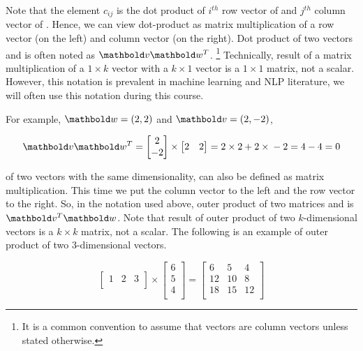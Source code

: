 Note that the element $c_{ij}$ is the dot product of
$i^{th}$ row vector of  and $j^{th}$ column vector of .
Hence, we can view dot-product as matrix multiplication
of a row vector (on the left) and column vector (on the right).
Dot product of two vectors  and  is often noted as
$\vect{v}\vect{w}^{T}$.%
\footnote{It is a common convention to assume that vectors are column vectors
  unless stated otherwise.}
Technically,
result of a matrix multiplication of a $1\times{}k$ vector with a $k\times{}1$
vector is a $1\times{}1$ matrix,
not a scalar.
However, this notation is prevalent in machine learning and NLP literature,
we will often use this notation during this course.

\label{pageref:vector-matrix-notation}
For example, $\vect{w} = (2, 2)$ and $\vect{v} = (2, -2)$,

\[
  \vect{v}\vect{w}^{T} = \begin{bmatrix}
    2 \\ -2 \\
  \end{bmatrix}
  \times
  \begin{bmatrix}
    2 & 2 \\
  \end{bmatrix}
  = 2\times{}2 + 2\times{}-2 = 4 - 4 = 0
\]


 of two vectors with the same dimensionality,
can also be defined as matrix multiplication.
This time we put the column vector to the left and the row vector to the right.
So, in the notation used above, outer product of two matrices  and  is
$\vect{v}^{T}\vect{w}$.
Note that result of outer product of two $k$-dimensional vectors is
a $k\times{}k$ matrix, not a scalar.
The following is an example of outer product of two $3$-dimensional vectors.

\[
  \begin{bmatrix}
    1 & 2 & 3\\
  \end{bmatrix}
  \times
  \begin{bmatrix}
    6 \\ 5  \\ 4 \\
  \end{bmatrix}
  =
  \begin{bmatrix}
    6  & 5 & 4 \\
    12  & 10 & 8 \\
    18  & 15 & 12 \\
  \end{bmatrix}
\]

